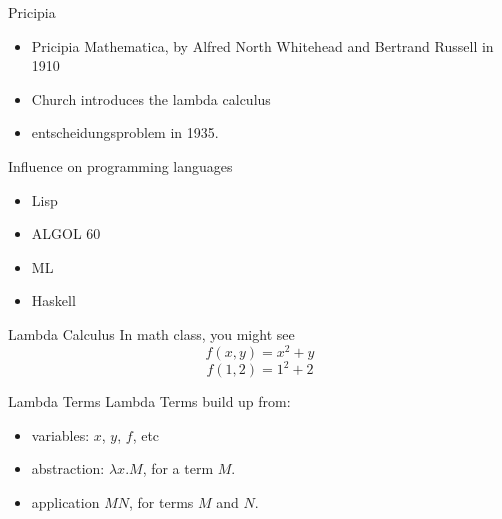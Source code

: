 \documentclass{beamer}
\begin{document}
\begin{frame}{Pricipia}
  \begin{itemize}
    \item Pricipia Mathematica, by Alfred North Whitehead and Bertrand Russell in 1910
    \item Church introduces the lambda calculus
    \item entscheidungsproblem in 1935.
  \end{itemize}
\end{frame}

\begin{frame}{Influence on programming languages}
  \begin{itemize}
    \item Lisp
    \item ALGOL 60
    \item ML
    \item Haskell
  \end{itemize}
\end{frame}

\begin{frame}{Lambda Calculus}
  In math class, you might see
  $$f(x, y) = x^2+y$$
  $$f(1, 2) = 1^2+2$$
\end{frame}

\begin{frame}{Lambda Terms}
  Lambda Terms build up from:
  \begin{itemize}
    \item variables: $x$, $y$, $f$, etc
    \item abstraction: $\lambda x. M$, for a term $M$.
    \item application $MN$, for terms $M$ and $N$.
  \end{itemize}
\end{frame}
\end{document}
